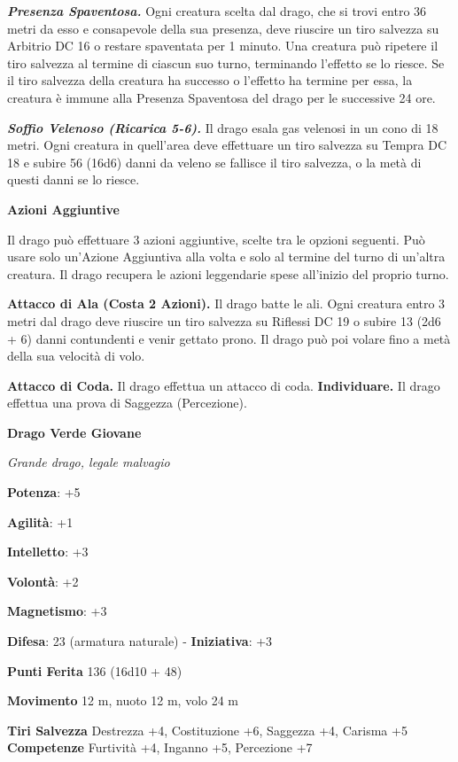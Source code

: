 \begin{multicols}{2}
\emph{\textbf{Presenza Spaventosa.}} Ogni creatura scelta dal drago, che
si trovi entro 36 metri da esso e consapevole della sua presenza, deve
riuscire un tiro salvezza su Arbitrio DC 16 o restare spaventata per 1
minuto. Una creatura può ripetere il tiro salvezza al termine di ciascun
suo turno, terminando l'effetto se lo riesce. Se il tiro salvezza della
creatura ha successo o l'effetto ha termine per essa, la creatura è
immune alla Presenza Spaventosa del drago per le successive 24 ore.

\emph{\textbf{Soffio Velenoso (Ricarica 5-6).}} Il drago esala gas
velenosi in un cono di 18 metri. Ogni creatura in quell'area deve
effettuare un tiro salvezza su Tempra DC 18 e subire 56 (16d6)
danni da veleno se fallisce il tiro salvezza, o la metà di questi danni
se lo riesce.

\textbf{Azioni Aggiuntive}

Il drago può effettuare 3 azioni aggiuntive, scelte tra le opzioni
seguenti. Può usare solo un'Azione Aggiuntiva alla volta e solo al
termine del turno di un'altra creatura. Il drago recupera le azioni
leggendarie spese all'inizio del proprio turno.

\textbf{Attacco di Ala (Costa 2 Azioni).} Il drago batte le ali. Ogni
creatura entro 3 metri dal drago deve riuscire un tiro salvezza su Riflessi DC 19 o subire 13 (2d6 + 6) danni contundenti e venir gettato
prono. Il drago può poi volare fino a metà della sua velocità di volo.

\textbf{Attacco di Coda.} Il drago effettua un attacco di coda.
\textbf{Individuare.} Il drago effettua una prova di Saggezza
(Percezione).

\textbf{Drago Verde Giovane}

\emph{Grande drago, legale malvagio}

\textbf{Potenza}: +5

\textbf{Agilità}: +1

\textbf{Intelletto}: +3

\textbf{Volontà}: +2

\textbf{Magnetismo}: +3

\textbf{Difesa}: 23 (armatura naturale) - \textbf{Iniziativa}: +3

\textbf{Punti Ferita} 136 (16d10 + 48)

\textbf{Movimento} 12 m, nuoto 12 m, volo 24 m

\textbf{Tiri Salvezza} Destrezza +4, Costituzione +6, Saggezza +4,
Carisma +5 \textbf{Competenze} Furtività +4, Inganno +5, Percezione +7


\end{multicols}
